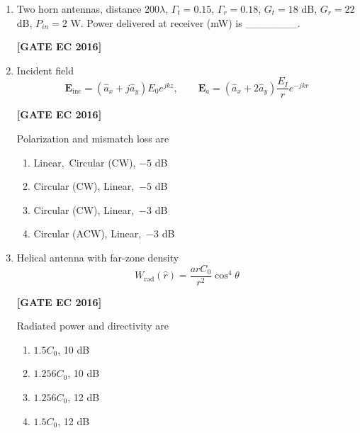 \documentclass[12pt]{article}
\begin{document}
\begin{enumerate}[label=\textbf{Q.\arabic*.}, start=6, itemsep=2em]
\begin{enumerate}[label=\textbf{Q.\arabic*.}, start=26]
\begin{enumerate}[label=\textbf{Q.\arabic*.}, start=31]
\item Two horn antennas, distance $200\lambda$, $\Gamma_t=0.15$, $\Gamma_r=0.18$, $G_t=18$ dB, $G_r=22$ dB, $P_{in}=2$ W. Power delivered at receiver (mW) is \_\_\_\_\_\_\_.

\noindent \textbf{[GATE EC 2016]}

\item Incident field
\[
\mathbf{E}_{\text{inc}} = (\hat{a}_x + j\hat{a}_y)E_0 e^{jkz}, \qquad
\mathbf{E}_a = (\hat{a}_x + 2\hat{a}_y)\frac{E_I}{r}e^{-jkr}
\]

\noindent \textbf{[GATE EC 2016]}

Polarization and mismatch loss are

\begin{multicols}{2}
    \begin{enumerate}
        \item Linear,\ Circular (CW), $-5$ dB
        \item Circular (CW), Linear,\ $-5$ dB
        \item Circular (CW), Linear,\ $-3$ dB
        \item Circular (ACW), Linear,\ $-3$ dB
    \end{enumerate}
\end{multicols}

\item Helical antenna with far-zone density
\[
W_{\text{rad}}(\hat{r}) = \frac{a r C_0}{r^2}\cos^{4}\theta
\]

\noindent \textbf{[GATE EC 2016]}

Radiated power and directivity are

\begin{multicols}{2}
    \begin{enumerate}
        \item $1.5C_0$, 10 dB
        \item $1.256C_0$, 10 dB
        \item $1.256C_0$, 12 dB
        \item $1.5C_0$, 12 dB
    \end{enumerate}
\end{multicols}

\end{enumerate}

\end{enumerate}

\end{enumerate}
\end{document}
